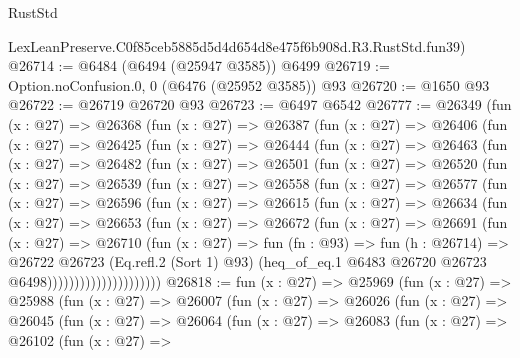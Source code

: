 \begin{lexlean}{RustStd}
\begin{coremodule}
    LexLeanPreserve.C0f85ceb5885d5d4d654d8e475f6b908d.R3.RustStd.fun39)
@26714 := @6484 (@6494 (@25947 @3585)) @6499
@26719 := Option.noConfusion.{0, 0} (@6476 (@25952 @3585)) @93
@26720 := @1650 @93
@26722 := @26719 @26720 @93
@26723 := @6497 @6542
@26777 := @26349
    (fun (x : @27) =>
    @26368
      (fun (x : @27) =>
      @26387
        (fun (x : @27) =>
        @26406
          (fun (x : @27) =>
          @26425
            (fun (x : @27) =>
            @26444
              (fun (x : @27) =>
              @26463
                (fun (x : @27) =>
                @26482
                  (fun (x : @27) =>
                  @26501
                    (fun (x : @27) =>
                    @26520
                      (fun (x : @27) =>
                      @26539
                        (fun (x : @27) =>
                        @26558
                          (fun (x : @27) =>
                          @26577
                            (fun (x : @27) =>
                            @26596
                              (fun (x : @27) =>
                              @26615
                                (fun (x : @27) =>
                                @26634
                                  (fun (x : @27) =>
                                  @26653
                                    (fun (x : @27) =>
                                    @26672
                                      (fun (x : @27) =>
                                      @26691
                                        (fun (x : @27) =>
                                        @26710
                                          (fun (x : @27) =>
                                          fun (fn : @93) =>
                                          fun (h : @26714) =>
                                          @26722
                                            @26723
                                            (Eq.refl.{2} (Sort 1) @93)
                                            (heq_of_eq.{1}
                                              @6483
                                              @26720
                                              @26723
                                              @6498)))))))))))))))))))))
@26818 := fun (x : @27) =>
  @25969
    (fun (x : @27) =>
    @25988
      (fun (x : @27) =>
      @26007
        (fun (x : @27) =>
        @26026
          (fun (x : @27) =>
          @26045
            (fun (x : @27) =>
            @26064
              (fun (x : @27) =>
              @26083
                (fun (x : @27) =>
                @26102
                  (fun (x : @27) =>

\end{coremodule}
\end{lexlean}
